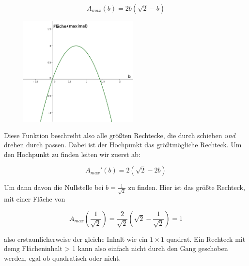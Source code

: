 \documentclass[a4paper,11pt]{article}
\begin{document}
\[ A_{max}(b) = 2b(\sqrt{2}-b) \]

\begin{figure}[htbp] 
        \centering
        \includegraphics[width=6cm]{img/FA_1.png}
\end{figure}

Diese Funktion beschreibt also alle größten Rechtecke, die durch schieben \textit{und} drehen durch passen. Dabei ist der Hochpunkt das größtmögliche Rechteck. Um den Hochpunkt zu finden leiten wir zuerst ab:

\[ A_{max}'(b) = 2(\sqrt{2}-2b) \]

Um dann davon die Nullstelle bei $b = \frac{1}{\sqrt{2}}$ zu finden. Hier ist das größte Rechteck, mit einer Fläche von

\[ A_{max}(\frac{1}{\sqrt{2}}) = \frac{2}{\sqrt{2}}(\sqrt{2} - \frac{1}{\sqrt{2}}) = 1 \]

also erstaunlicherweise der gleiche Inhalt wie ein $1\times 1$ quadrat. Ein Rechteck mit demg Flächeninhalt > 1 kann also einfach nicht durch den Gang geschoben werden, egal ob quadratisch oder nicht.
\end{document}
